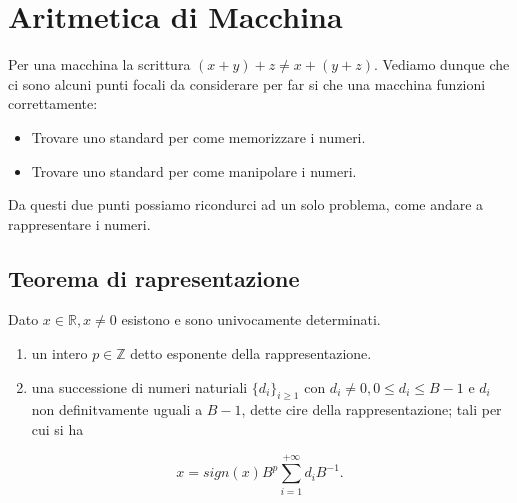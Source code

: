 \section{Aritmetica di Macchina}
Per una macchina la scrittura $(x + y) + z \neq x + (y + z)$. Vediamo dunque che ci sono alcuni punti focali da considerare
per far si che una macchina funzioni correttamente:

\begin{itemize}
    \item Trovare uno standard per come memorizzare i numeri.
    \item Trovare uno standard per come manipolare i numeri.
\end{itemize}

\hspace{-15pt}Da questi due punti possiamo ricondurci ad un solo problema, come andare a rappresentare i numeri.

\subsection{Teorema di rapresentazione}
\begin{theorem}
    Dato $x \in \mathbb{R}, x \neq 0$ esistono e sono univocamente determinati.
    \begin{enumerate}
        \item un intero $p \in \mathbb{Z}$ detto esponente della rappresentazione.
        \item una successione di numeri naturiali $\{d_i\}_{i\geq 1}$ con $d_i \neq 0, 0 \leq d_i \leq B - 1$ e $d_i$
        non definitvamente uguali a \(B - 1\), dette cire della rappresentazione; tali per cui si ha
    \end{enumerate}
    \begin{equation}
        x = sign(x)B^p \sum_{i=1}^{+\infty}d_i B^{-1}.
    \end{equation}
\end{theorem}

